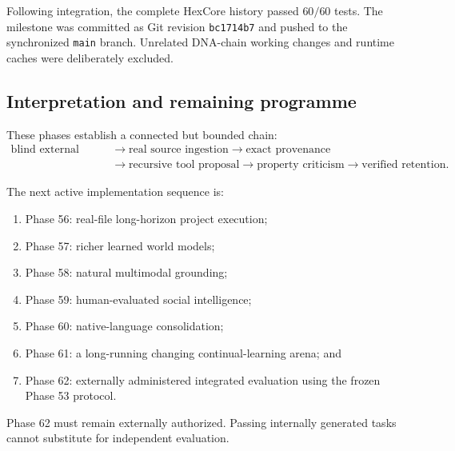 Following integration, the complete HexCore history passed \(60/60\) tests.
The milestone was committed as Git revision \texttt{bc1714b7} and pushed to
the synchronized \texttt{main} branch.  Unrelated DNA-chain working changes
and runtime caches were deliberately excluded.

\subsection{Interpretation and remaining programme}

These phases establish a connected but bounded chain:
\[
\begin{aligned}
\text{blind external contract}
&\rightarrow \text{real source ingestion}
\rightarrow \text{exact provenance}\\
&\rightarrow \text{recursive tool proposal}
\rightarrow \text{property criticism}
\rightarrow \text{verified retention}.
\end{aligned}
\]

The next active implementation sequence is:
\begin{enumerate}
    \item Phase 56: real-file long-horizon project execution;
    \item Phase 57: richer learned world models;
    \item Phase 58: natural multimodal grounding;
    \item Phase 59: human-evaluated social intelligence;
    \item Phase 60: native-language consolidation;
    \item Phase 61: a long-running changing continual-learning arena; and
    \item Phase 62: externally administered integrated evaluation using the
    frozen Phase 53 protocol.
\end{enumerate}

Phase 62 must remain externally authorized.  Passing internally generated
tasks cannot substitute for independent evaluation.
